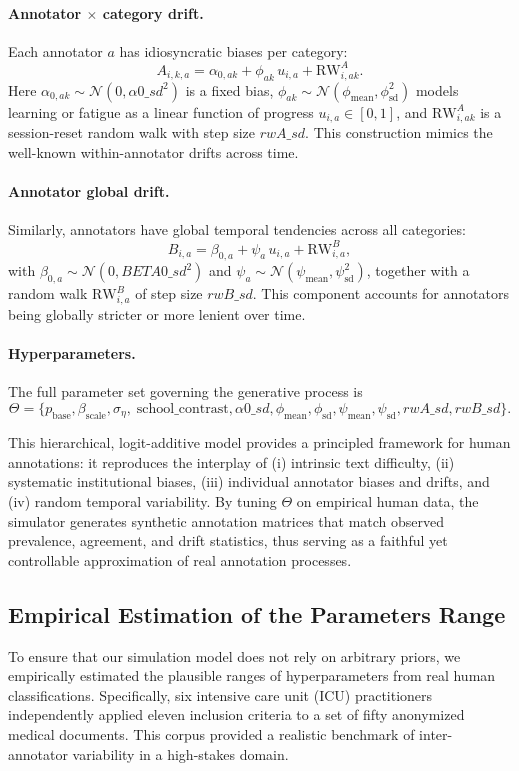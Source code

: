 \documentclass[12pt]{article}
\begin{document}
\paragraph{Annotator $\times$ category drift.}  
Each annotator $a$ has idiosyncratic biases per category:
\[
A_{i,k,a} = \alpha_{0,ak} + \phi_{ak}\,u_{i,a} + \mathrm{RW}^A_{i,ak}.
\]
Here $\alpha_{0,ak} \sim \mathcal{N}(0,\alpha0\_sd^2)$ is a
fixed bias, $\phi_{ak} \sim \mathcal{N}(\phi_{\text{mean}},\phi_{\text{sd}}^2)$
models learning or fatigue as a linear function of progress
$u_{i,a}\in[0,1]$, and $\mathrm{RW}^A_{i,ak}$ is a session-reset
random walk with step size $rwA\_sd$. This construction mimics the
well-known within-annotator drifts across time.

\paragraph{Annotator global drift.}  
Similarly, annotators have global temporal tendencies across all
categories:
\[
B_{i,a} = \beta_{0,a} + \psi_a\,u_{i,a} + \mathrm{RW}^B_{i,a},
\]
with $\beta_{0,a}\sim\mathcal{N}(0,BETA0\_sd^2)$ and
$\psi_a \sim \mathcal{N}(\psi_{\text{mean}},\psi_{\text{sd}}^2)$,
together with a random walk $\mathrm{RW}^B_{i,a}$ of step size $rwB\_sd$.
This component accounts for annotators being globally stricter or
more lenient over time.

\paragraph{Hyperparameters.}  
The full parameter set governing the generative process is
\[
\Theta = \Big\{ p_{\text{base}}, \beta_{\text{scale}}, \sigma_\eta,
\;\text{school\_contrast}, \alpha0\_sd, \phi_{\text{mean}}, \phi_{\text{sd}},
\psi_{\text{mean}}, \psi_{\text{sd}}, rwA\_sd, rwB\_sd \Big\}.
\]

\medskip
This hierarchical, logit-additive model provides a principled framework
for human annotations: it reproduces the interplay of (i) intrinsic
text difficulty, (ii) systematic institutional biases, (iii) individual
annotator biases and drifts, and (iv) random temporal variability.
By tuning $\Theta$ on empirical human data, the simulator generates
synthetic annotation matrices that match observed prevalence,
agreement, and drift statistics, thus serving as a faithful yet
controllable approximation of real annotation processes.

\subsection{Empirical Estimation of the Parameters Range}
\label{sec:empirical-estimation}
To ensure that our simulation model does not rely on arbitrary priors, we empirically 
estimated the plausible ranges of hyperparameters from real human classifications. 
Specifically, six intensive care unit (ICU) practitioners independently applied eleven 
inclusion criteria to a set of fifty anonymized medical documents. This corpus provided a 
realistic benchmark of inter-annotator variability in a high-stakes domain.
\end{document}
